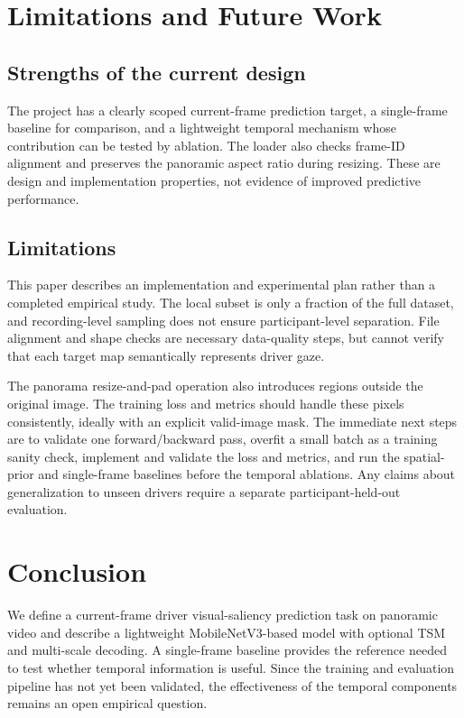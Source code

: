 \documentclass[10pt,twocolumn,letterpaper]{article}
\begin{document}
\section{Limitations and Future Work}
\label{sec:limitations}

\subsection{Strengths of the current design}

The project has a clearly scoped current-frame prediction target, a
single-frame baseline for comparison, and a lightweight temporal mechanism
whose contribution can be tested by ablation. The loader also checks
frame-ID alignment and preserves the panoramic aspect ratio during resizing.
These are design and implementation properties, not evidence of improved
predictive performance.

\subsection{Limitations}

This paper describes an implementation and experimental plan rather than a
completed empirical study. The local subset is only a fraction of the full
dataset, and recording-level sampling does not ensure participant-level
separation. File alignment and shape checks are necessary data-quality steps,
but cannot verify that each target map semantically represents driver gaze.

The panorama resize-and-pad operation also introduces regions outside the
original image. The training loss and metrics should handle these pixels
consistently, ideally with an explicit valid-image mask. The immediate next
steps are to validate one forward/backward pass, overfit a small batch as a
training sanity check, implement and validate the loss and metrics, and run
the spatial-prior and single-frame baselines before the temporal ablations.
Any claims about generalization to unseen drivers require a separate
participant-held-out evaluation.

\section{Conclusion}
\label{sec:conclusion}

We define a current-frame driver visual-saliency prediction task on panoramic
video and describe a lightweight MobileNetV3-based model with optional TSM
and multi-scale decoding. A single-frame baseline provides the reference
needed to test whether temporal information is useful. Since the training
and evaluation pipeline has not yet been validated, the effectiveness of the
temporal components remains an open empirical question.



\end{document}
